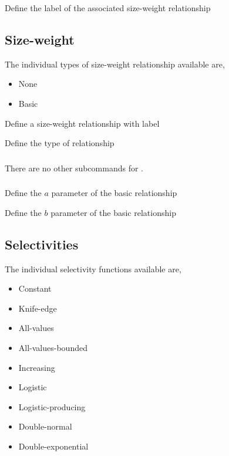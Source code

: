  {Define the label of the associated size-weight relationship}

\subsection{Size-weight}

The individual types of size-weight relationship available are, 

\begin{itemize}
	\item None
	\item Basic
\end{itemize}

 {Define a size-weight relationship with label}

 {Define the type of relationship}

\subsubsection[None]{}

There are no other subcommands for .

\subsubsection[Basic]{}

 {Define the $a$ parameter of the basic relationship}

 {Define the $b$ parameter of the basic relationship}

\subsection{Selectivities}

The individual selectivity functions available are, 

\begin{itemize}
	\item Constant
	\item Knife-edge
	\item All-values
	\item All-values-bounded
	\item Increasing
	\item Logistic
	\item Logistic-producing
	\item Double-normal
	\item Double-exponential
\end{itemize}

